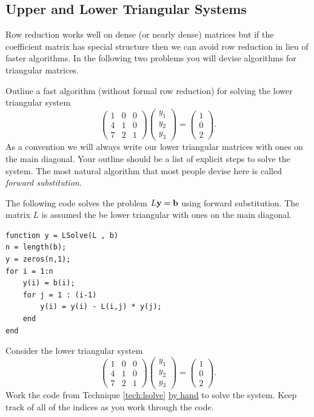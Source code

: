\subsection{Upper and Lower Triangular Systems}
Row reduction works well on dense (or nearly dense) matrices but if the coefficient matrix
has special structure then we can avoid row reduction in lieu of faster algorithms. In the
following two problems you will devise algorithms for triangular matrices.

\begin{problem}
    Outline a fast algorithm (without formal row reduction) for solving the lower triangular system
    \[ \begin{pmatrix} 1 & 0 & 0 \\ 4 & 1 & 0 \\ 7 & 2 & 1 \end{pmatrix} \begin{pmatrix}
        y_1 \\ y_2 \\ y_3 \end{pmatrix} = \begin{pmatrix} 1 \\ 0 \\ 2\end{pmatrix}. \]
    As a convention we will always write our lower triangular matrices with ones on the
    main diagonal.  Your outline should be a list of explicit steps to solve the system.
    The most natural algorithm that most people devise here is called {\it forward
    substitution}.
\end{problem}


\begin{technique}\label{tech:lsolve}
    The following code solves the problem $L {\bf y} = {\bf b}$ using forward
    substitution.  The matrix $L$ is assumed the be lower triangular with ones on the main
    diagonal.
\begin{lstlisting}
function y = LSolve(L , b)
n = length(b);
y = zeros(n,1);
for i = 1:n
    y(i) = b(i);
    for j = 1 : (i-1)
        y(i) = y(i) - L(i,j) * y(j);
    end
end
\end{lstlisting}
\end{technique}

\begin{problem}
    Consider the lower triangular system 
    \[ \begin{pmatrix} 1 & 0 & 0 \\ 4 & 1 & 0 \\ 7 & 2 & 1 \end{pmatrix} \begin{pmatrix}
        y_1 \\ y_2 \\ y_3 \end{pmatrix} = \begin{pmatrix} 1 \\ 0 \\ 2\end{pmatrix}. \]
    Work the code from Technique \ref{tech:lsolve} \underline{by hand} to solve the
    system.  Keep track of all of the indices as you work through the code.
\end{problem}

